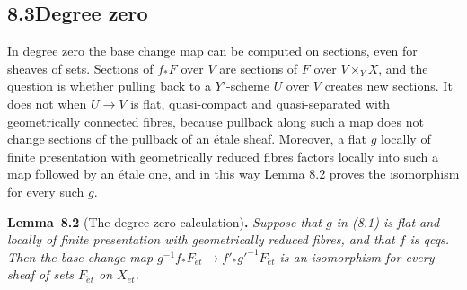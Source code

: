 \documentclass[11pt]{article}
\newenvironment{bpstatement}[2]{\par\addvspace{0.6\baselineskip}\noindent\textbf{#1}#2\textbf{.}\enspace\ignorespaces}
  {\par\addvspace{0.4\baselineskip}}
\newenvironment{bpstatementit}[2]{\begin{bpstatement}{#1}{#2}\itshape\ignorespaces}{\end{bpstatement}}
\begin{document}
\subsection*{\texorpdfstring{8.3\quad Degree zero}{8.3 Degree zero}}
\label{bp645}%
\label{bp646}%
In degree zero the base change map can be computed on sections, even for sheaves of sets. Sections of \(f_*F\) over \(V\) are sections of \(F\) over \(V\times_YX\), and the question is whether pulling back to a \(Y'\)-scheme \(U\) over \(V\) creates new sections. It does not when \(U\to V\) is flat, quasi-compact and quasi-separated with geometrically connected fibres, because pullback along such a map does not change sections of the pullback of an étale sheaf. Moreover, a flat \(g\) locally of finite presentation with geometrically reduced fibres factors locally into such a map followed by an étale one, and in this way Lemma \hyperref[bp647]{8.2} proves the isomorphism for every such \(g\).

\label{bp647}%
\begin{bpstatementit}{Lemma~8.2}{ (The degree-zero calculation)}
Suppose that \(g\) in (8.1) is flat and locally of finite presentation with geometrically reduced fibres, and that \(f\) is qcqs. Then the base change map \(g^{-1}f_*F_{\acute{e}t}\to f'_*g'^{-1}F_{\acute{e}t}\) is an isomorphism for every sheaf of sets \(F_{\acute{e}t}\) on \(X_{\acute{e}t}\).
\end{bpstatementit}
\end{document}
